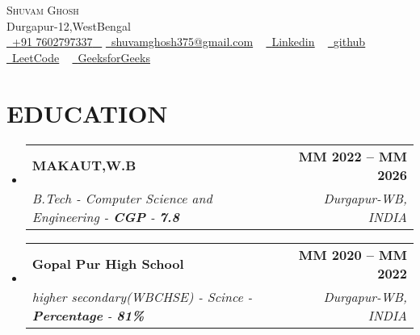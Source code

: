 \documentclass[letterpaper,11pt]{article}
\makeatletter
\newcommand{\resumeSubheading}[4]{
  \vspace{-2pt}\item
    \begin{tabular*}{1.0\textwidth}[t]{l@{\extracolsep{\fill}}r}
      \textbf{\large#1} & \textbf{\small #2} \\
      \textit{\large#3} & \textit{\small #4} \\
     
    \end{tabular*}\vspace{-7pt}
}
\newcommand{\resumeSubHeadingListStart}{\begin{itemize}[leftmargin=0.0in, label={}]}
\newcommand{\resumeSubHeadingListEnd}{\end{itemize}}
\makeatother
\begin{document}




\begin{center}
    {\Huge \scshape Shuvam Ghosh} \\ \vspace{1pt}
    Durgapur-12,WestBengal \\ \vspace{1pt}
    \small \href{tel:+xxxxxxxxxxxx}{ \raisebox{-0.1\height}\faPhone\ \underline{+91 7602797337} ~} \href{mailto:yourname@gmail.com}{\raisebox{-0.2\height}\faEnvelope\  \underline{shuvamghosh375@gmail.com}} ~
    \href{linkedin.com/in/shuvam-ghosh-7a469a264}{\raisebox{-0.2\height}\faLinkedinSquare\ \underline{Linkedin}}  ~
    \href{https://github.com/mastershuvam}{\raisebox{-0.2\height}\faGithub\ \underline{github}} ~
    \href{https://leetcode.com/u/Shuvam234/}{\ \underline{LeetCode}} ~
    \vspace{-8pt}
    \href{https://www.geeksforgeeks.org/user/shuvamghb21h/}{\ \underline{GeeksforGeeks}} ~
\end{center}
 \vspace{0.5mm}

\section{EDUCATION}
  \resumeSubHeadingListStart
    \resumeSubheading
      {MAKAUT,W.B}{MM 2022 -- MM 2026}
      {B.Tech - Computer Science and Engineering - \textbf{CGP} - \textbf{7.8}}{Durgapur-WB, INDIA}
  \resumeSubHeadingListEnd
 
  \resumeSubHeadingListStart
    \resumeSubheading
      {Gopal Pur High School}{MM 2020 -- MM 2022}
      {higher secondary(WBCHSE) - Scince  - \textbf{Percentage} - \textbf{81\%}}{Durgapur-WB, INDIA}
  \resumeSubHeadingListEnd


\end{document}
